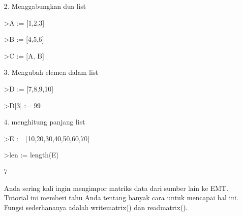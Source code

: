 \documentclass[a4paper,10pt]{article}
\begin{document}
\begin{eulernotebook}
\begin{eulercomment}
\begin{eulercomment}
\begin{eulercomment}
\begin{eulercomment}
\begin{eulercomment}
\begin{eulercomment}
\begin{eulercomment}
\begin{eulercomment}
\begin{eulercomment}
\begin{eulercomment}
\begin{eulercomment}
\begin{eulercomment}
\begin{eulercomment}
2. Menggabungkan dua list
\end{eulercomment}
\begin{eulerprompt}
>A := [1,2,3]
\end{eulerprompt}
\begin{euleroutput}
  [1,  2,  3]
\end{euleroutput}
\begin{eulerprompt}
>B := [4,5,6]
\end{eulerprompt}
\begin{euleroutput}
  [4,  5,  6]
\end{euleroutput}
\begin{eulerprompt}
>C := [A, B]
\end{eulerprompt}
\begin{euleroutput}
  [1,  2,  3,  4,  5,  6]
\end{euleroutput}
\begin{eulercomment}
3. Mengubah elemen dalam list
\end{eulercomment}
\begin{eulerprompt}
>D := [7,8,9,10]
\end{eulerprompt}
\begin{euleroutput}
  [7,  8,  9,  10]
\end{euleroutput}
\begin{eulerprompt}
>D[3] := 99
\end{eulerprompt}
\begin{euleroutput}
  [7,  8,  99,  10]
\end{euleroutput}
\begin{eulercomment}
4. menghitung panjang list
\end{eulercomment}
\begin{eulerprompt}
>E := [10,20,30,40,50,60,70]
\end{eulerprompt}
\begin{euleroutput}
  [10,  20,  30,  40,  50,  60,  70]
\end{euleroutput}
\begin{eulerprompt}
>len := length(E)
\end{eulerprompt}
\begin{euleroutput}
  7
\end{euleroutput}
\begin{eulercomment}
\begin{eulercomment}
\begin{eulercomment}
Anda sering kali ingin mengimpor matriks data dari sumber lain ke EMT.
Tutorial ini memberi tahu Anda tentang banyak cara untuk mencapai hal
ini. Fungsi sederhananya adalah writematrix() dan readmatrix().


\end{eulercomment}
\end{eulercomment}
\end{eulercomment}
\end{eulercomment}
\end{eulercomment}
\end{eulercomment}
\end{eulercomment}
\end{eulercomment}
\end{eulercomment}
\end{eulercomment}
\end{eulercomment}
\end{eulercomment}
\end{eulercomment}
\end{eulercomment}
\end{eulercomment}
\end{eulernotebook}
\end{document}
